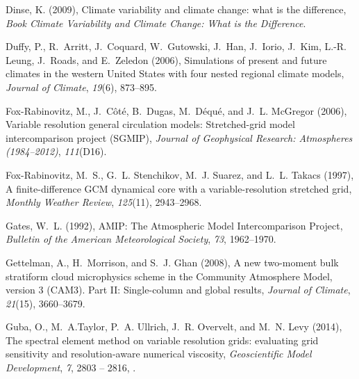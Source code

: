 \documentclass[ms]{agutex}   %
\begin{document}
\begin{article}
\begin{thebibliography}{84}
Dinse, K. (2009), Climate variability and climate change: what is the
  difference, \textit{Book Climate Variability and Climate Change: What is the
  Difference}.

Duffy, P., R.~Arritt, J.~Coquard, W.~Gutowski, J.~Han, J.~Iorio, J.~Kim, L.-R.
  Leung, J.~Roads, and E.~Zeledon (2006), {Simulations of present and future
  climates in the western United States with four nested regional climate
  models}, \textit{Journal of Climate}, \textit{19}(6), 873--895.

Fox-Rabinovitz, M., J.~C{\^o}t{\'e}, B.~Dugas, M.~D{\'e}qu{\'e}, and J.~L.
  McGregor (2006), {Variable resolution general circulation models:
  Stretched-grid model intercomparison project (SGMIP)}, \textit{Journal of
  Geophysical Research: Atmospheres (1984--2012)}, \textit{111}(D16).

Fox-Rabinovitz, M.~S., G.~L. Stenchikov, M.~J. Suarez, and L.~L. Takacs (1997),
  {A finite-difference GCM dynamical core with a variable-resolution stretched
  grid}, \textit{Monthly Weather Review}, \textit{125}(11), 2943--2968.

{Gates}, W.~L. (1992), {AMIP: The Atmospheric Model Intercomparison Project},
  \textit{Bulletin of the American Meteorological Society}, \textit{73},
  1962--1970.

Gettelman, A., H.~Morrison, and S.~J. Ghan (2008), {A new two-moment bulk
  stratiform cloud microphysics scheme in the Community Atmosphere Model,
  version 3 (CAM3). Part II: Single-column and global results}, \textit{Journal
  of Climate}, \textit{21}(15), 3660--3679.

Guba, O., M.~A.Taylor, P.~A. Ullrich, J.~R. Overvelt, and M.~N. Levy (2014),
  The spectral element method on variable resolution grids: evaluating grid
  sensitivity and resolution-aware numerical viscosity, \textit{Geoscientific
  Model Development}, \textit{7}, 2803 -- 2816, .


\end{thebibliography}
\end{article}
\end{document}
